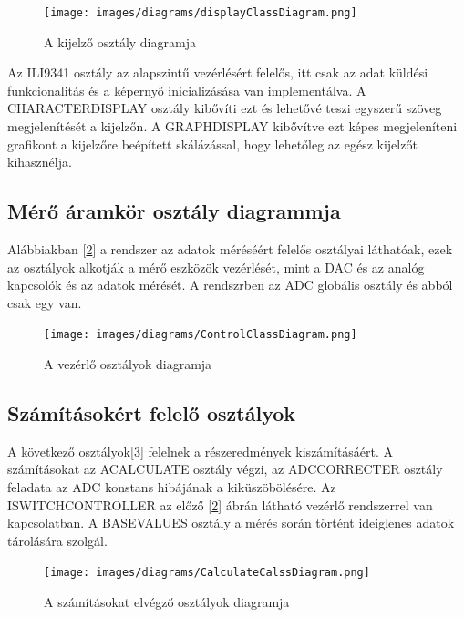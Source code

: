 \begin{figure}[h]
    \centering
    \texttt{[image: images/diagrams/displayClassDiagram.png]}
    \caption{A kijelző osztály diagramja}
    \label{fig:displayClassDiagram}
\end{figure}

Az ILI9341 osztály az alapszintű vezérlésért felelős, itt csak az 
adat küldési funkcionalitás és a képernyő inicializásása van
implementálva. A CHARACTERDISPLAY osztály kibővíti ezt és lehetővé
teszi egyszerű szöveg megjelenítését a kijelzőn.
A GRAPHDISPLAY kibővítve ezt képes megjeleníteni grafikont
a kijelzőre beépített skálázással, hogy lehetőleg az egész kijelzőt kihasznélja.


\subsection{Mérő áramkör osztály diagrammja}

Alábbiakban [\ref{fig:ControlClassDiagram}] a rendszer az adatok méréséért felelős osztályai láthatóak,
ezek az osztályok alkotják a mérő eszközök vezérlését, mint a 
DAC és az analóg kapcsolók és az adatok mérését.
A rendszrben az ADC globális osztály és abból csak egy van.

\begin{figure}[H]
    \centering
    \texttt{[image: images/diagrams/ControlClassDiagram.png]}
    \caption{A vezérlő osztályok diagramja}
    \label{fig:ControlClassDiagram}
\end{figure}


\subsection{Számításokért felelő osztályok}

A következő osztályok[\ref{fig:CalculateClassDiagram}] felelnek a részeredmények kiszámításáért. A 
számításokat az ACALCULATE osztály végzi, az ADCCORRECTER osztály
feladata az ADC konstans hibájának a kiküszöbölésére. Az 
ISWITCHCONTROLLER az előző [\ref{fig:ControlClassDiagram}] ábrán látható
vezérlő rendszerrel van kapcsolatban. A BASEVALUES osztály a mérés során
történt ideiglenes adatok tárolására szolgál.


\begin{figure}[H]
    \centering
    \texttt{[image: images/diagrams/CalculateCalssDiagram.png]}
    \caption{A számításokat elvégző osztályok diagramja}
    \label{fig:CalculateClassDiagram}
\end{figure}


